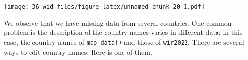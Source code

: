 \documentclass[
  xelatex, ja=standard]{bxjsbook}
\newenvironment{Shaded}{\begin{snugshade}}{\end{snugshade}}
\newcommand{\AttributeTok}[1]{\textcolor[rgb]{0.13,0.29,0.53}{#1}}
\newcommand{\ConstantTok}[1]{\textcolor[rgb]{0.56,0.35,0.01}{#1}}
\newcommand{\DecValTok}[1]{\textcolor[rgb]{0.00,0.00,0.81}{#1}}
\newcommand{\FunctionTok}[1]{\textcolor[rgb]{0.13,0.29,0.53}{\textbf{#1}}}
\newcommand{\NormalTok}[1]{#1}
\newcommand{\OtherTok}[1]{\textcolor[rgb]{0.56,0.35,0.01}{#1}}
\newcommand{\SpecialCharTok}[1]{\textcolor[rgb]{0.81,0.36,0.00}{\textbf{#1}}}
\newcommand{\StringTok}[1]{\textcolor[rgb]{0.31,0.60,0.02}{#1}}
\theoremstyle{definition}
\theoremstyle{definition}
\theoremstyle{definition}
\theoremstyle{definition}
\theoremstyle{remark}
\begin{document}
\begin{Shaded}
\end{Shaded}

\texttt{[image: 36-wid\_files/figure-latex/unnamed-chunk-20-1.pdf]}

We observe that we have missing data from several countries. One common problem is the description of the country names varies in different data; in this case, the country names of \texttt{map\_data()} and those of \texttt{wir2022}. There are several ways to edit country names. Here is one of them.
\end{document}
